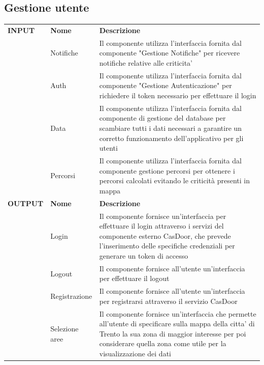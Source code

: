 \documentclass{article}
\begin{document}
\clearpage

\subsection{Gestione utente}

\begin{table}[htbp]
    \centering
    \renewcommand{\arraystretch}{1.5} %
    \begin{tabularx}{\textwidth}{| l | l | X |}
        \Xhline{2pt}
        \textbf{INPUT} & \textbf{Nome} & \textbf{Descrizione} \\
        \Xhline{2pt}
         & Notifiche & Il componente utilizza l'interfaccia fornita dal componente "Gestione Notifiche" per ricevere notifiche relative alle criticita' \\
        \hline
         & Auth & Il componente utilizza l'interfaccia fornita dal componente "Gestione Autenticazione" per richiedere il token necessario per effettuare il login \\
        \hline
         & Data & Il componente utilizza l'interfaccia fornita dal componente di gestione del database per scambiare tutti i dati necessari a garantire un corretto funzionamento dell'applicativo per gli utenti \\
        \hline
         & Percorsi & Il componente utilizza l'interfaccia fornita dal componente gestione percorsi per ottenere i percorsi calcolati evitando le criticità presenti in mappa \\
        \Xhline{2pt}
        \textbf{OUTPUT} & \textbf{Nome} & \textbf{Descrizione} \\
        \Xhline{2pt}
         & Login & Il componente fornisce un'interfaccia per effettuare il login attraverso i servizi del componente esterno CasDoor, che prevede l'inserimento delle specifiche credenziali per generare un token di accesso \\
        \hline
         & Logout & Il componente fornisce all'utente un'interfaccia per effettuare il logout \\
        \hline
         & Registrazione & Il componente fornisce all'utente un'interfaccia per registrarsi attraverso il servizio CasDoor \\
        \hline
         & Selezione aree & Il componente fornisce un'interfaccia che permette all'utente di specificare sulla mappa della citta' di Trento la sua zona di maggior interesse per poi considerare quella zona come utile per la visualizzazione dei dati \\

\end{tabularx}
\end{table}
\end{document}

